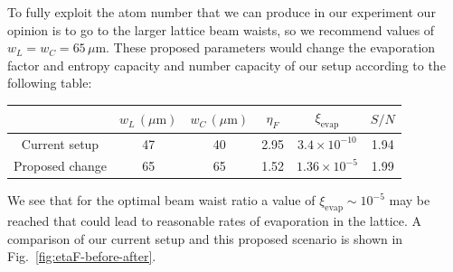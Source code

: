 \documentclass[11pt,letter]{article}
\begin{document}
To fully exploit the atom number that we can produce in our experiment our
opinion is to go to the larger lattice beam waists,  so we recommend values of
$w_{L}=w_{C}=65\,\mu$m.   These proposed parameters  would change the
evaporation factor and entropy capacity and number capacity of our setup
according to the following table:
\begin{center}
\begin{tabular}{ c|c|c|c|c|c}
   &  $w_{L}\,(\mu\mathrm{m})$ & $w_{C}\,(\mu\mathrm{m})$ 
   & $\eta_{F}$  & $\xi_{\text{evap}}$ &  $S/N$  \\ \hline 
 Current setup &  47 & 40  &  2.95 & $3.4\times 10^{-10}$  &   1.94  \\ 
 Proposed change & 65 & 65  &  1.52 & $1.36\times 10^{-5}$  &   1.99  \\
\end{tabular}
\end{center}
We see that for the optimal beam waist ratio a value of
$\xi_{\text{evap}}\sim10^{-5}$ may be reached that could lead to reasonable
rates of evaporation in the lattice.  A comparison of our current setup and
this proposed scenario is shown in Fig.~\ref{fig:etaF-before-after}. 
\end{document}
